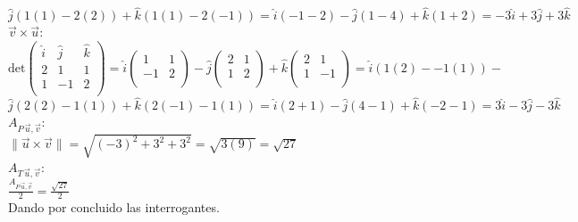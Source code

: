 \documentclass[letterpaper, 12pt]{article}
\begin{document}
\(\hat{j}(1(1)-2(2))+\hat{k}(1(1)-2(-1))=\hat{i}(-1-2)-\hat{j}(1-4)+\hat{k}(1+2)=-3\hat{i}+3\hat{j}+3\hat{k}\) \\ \newline
\(\vec{v}\times \vec{u}\):\\ \newline %
\(\text{det}\begin{pmatrix}
    \hat{i} &\hat{j}& \hat{k}\\
           2&1&1\\ 
           1&-1&2\\ 
\end{pmatrix}=\hat{i}\begin{pmatrix}
   1&1\\ 
-1&2\\
\end{pmatrix}-\hat{j}\begin{pmatrix}
  2&1\\  
  1&2\\  
\end{pmatrix}+\hat{k}\begin{pmatrix}
  2&1\\  
  1&-1\\  
\end{pmatrix}=\hat{i}(1(2)--1(1))-\)\\ \newline
\(\hat{j}(2(2)-1(1))+\hat{k}(2(-1)-1(1))=\hat{i}(2+1)-\hat{j}(4-1)+\hat{k}(-2-1)=3\hat{i}-3\hat{j}-3\hat{k}\) \\ \newline
\(A_{P\,\vec{u},\vec{v}}\):\\ \newline
\(\lVert\vec{u}\times \vec{v}\rVert=\sqrt{(-3)^2+3^2+3^2}=\sqrt{3(9)}=\sqrt{27}\) \\ \newline
\(A_{T\,\vec{u},\vec{v}}\): \\ \newline
\(\frac{A_{P\,\vec{u},\vec{v}}}{2}=\frac{\sqrt{27}}{2}\) \\ \newline
Dando por concluido las interrogantes.
\end{document}

